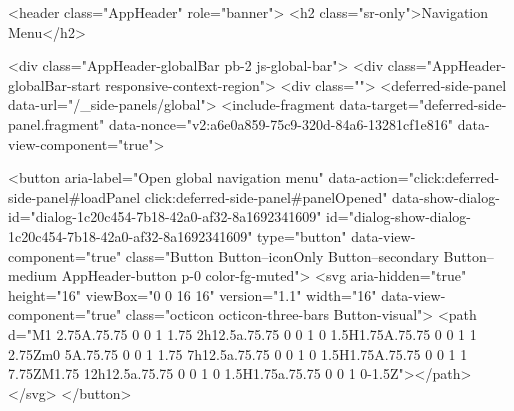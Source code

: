       

          

              <header class="AppHeader" role="banner">
  <h2 class="sr-only">Navigation Menu</h2>


    

    <div class="AppHeader-globalBar pb-2 js-global-bar">
      <div class="AppHeader-globalBar-start responsive-context-region">
        <div class="">
            <deferred-side-panel data-url="/_side-panels/global">
  <include-fragment data-target="deferred-side-panel.fragment" data-nonce="v2:a6e0a859-75c9-320d-84a6-13281cf1e816" data-view-component="true">
  
      <button aria-label="Open global navigation menu" data-action="click:deferred-side-panel#loadPanel click:deferred-side-panel#panelOpened" data-show-dialog-id="dialog-1c20c454-7b18-42a0-af32-8a1692341609" id="dialog-show-dialog-1c20c454-7b18-42a0-af32-8a1692341609" type="button" data-view-component="true" class="Button Button--iconOnly Button--secondary Button--medium AppHeader-button p-0 color-fg-muted">  <svg aria-hidden="true" height="16" viewBox="0 0 16 16" version="1.1" width="16" data-view-component="true" class="octicon octicon-three-bars Button-visual">
    <path d="M1 2.75A.75.75 0 0 1 1.75 2h12.5a.75.75 0 0 1 0 1.5H1.75A.75.75 0 0 1 1 2.75Zm0 5A.75.75 0 0 1 1.75 7h12.5a.75.75 0 0 1 0 1.5H1.75A.75.75 0 0 1 1 7.75ZM1.75 12h12.5a.75.75 0 0 1 0 1.5H1.75a.75.75 0 0 1 0-1.5Z"></path>
</svg>
</button>

